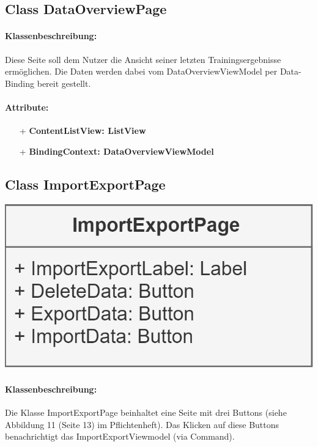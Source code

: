 \documentclass[a4paper,12pt]{article}
\begin{document}
	\subsection{Class DataOverviewPage}
		\paragraph{Klassenbeschreibung:}
		Diese Seite soll dem Nutzer die Ansicht seiner letzten Trainingsergebnisse ermöglichen.
		Die Daten werden dabei vom DataOverviewViewModel per Data-Binding bereit gestellt.
		\paragraph{Attribute:}
		\begin{itemize}
			\item[+] \textbf{ContentListView: ListView}
			\item[+] \textbf{BindingContext: DataOverviewViewModel} 
		\end{itemize}

	
\begin{minipage}[b]{0.7\textwidth}

	\subsection{Class ImportExportPage}

\end{minipage}
\begin{minipage}[c]{0.3\textwidth}
	\includegraphics[width=\textwidth]{bilder/ViewKlassen/ImportExportPage.png}
\end{minipage}
		\paragraph{Klassenbeschreibung:}
		Die Klasse ImportExportPage beinhaltet eine Seite mit drei Buttons (siehe Abbildung 11 (Seite 13) im Pflichtenheft).
		Das Klicken auf diese Buttons benachrichtigt das ImportExportViewmodel (via Command).
\end{document}
